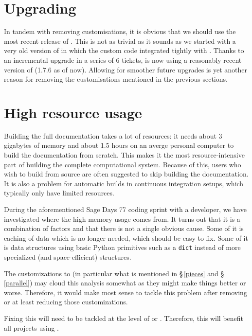 \documentclass{deliverablereport}
\begin{document}
\section{Upgrading \Sphinx}

In tandem with removing customisations, it is obvious that we should
use the most recent release of \Sphinx. This is not as trivial as it
sounds as we started with a very old version of \Sphinx in which the
custom code integrated tightly with \Sphinx. Thanks to an incremental
upgrade in a series of 6 tickets, \Sage is now using a reasonably
recent version of \Sphinx (1.7.6 as of now). Allowing for smoother
future upgrades is yet another reason for removing the customisations
mentioned in the previous sections.

\section{High resource usage}\label{resources}

Building the full \Sage documentation takes a lot of resources:
it needs about 3 gigabytes of memory and about 1.5 hours
on an averge personal computer to build the documentation from scratch.
This makes it the most resource-intensive part of
building the complete \Sage computational system.
Because of this, \Sage users who wish to build from source are often
suggested to skip building the documentation.
It is also a problem for automatic builds in continuous integration
setups, which typically only have limited resources.

During the aforementioned Sage Days 77 coding sprint with a \Sphinx
developer, we have investigated where the high memory usage comes from.
It turns out that it is a combination of factors
and that there is not a single obvious cause.
Some of it is caching of data which is no longer needed,
which should be easy to fix.
Some of it is data structures using basic Python primitives such as a \texttt{dict}
instead of more specialized (and space-efficient) structures.

The \Sage customizations to \Sphinx
(in particular what is mentioned in \S\,\ref{pieces} and \S\,\ref{parallel})
may cloud this analysis somewhat
as they might make things better or worse.
Therefore, it would make most sense to tackle this problem after
removing or at least reducing those customizations.

Fixing this will need to be tackled at the level
of \Docutils or \Sphinx.
Therefore, this will benefit all projects using \Sphinx.
\end{document}
